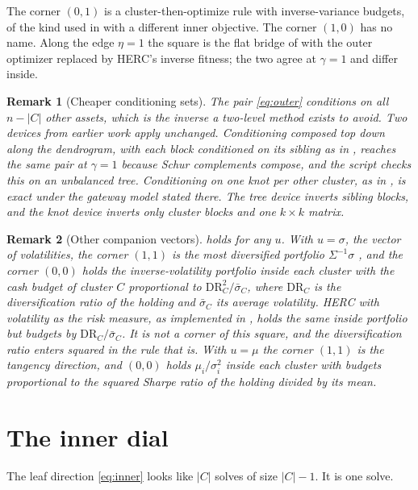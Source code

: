 \documentclass[11pt]{article}
\newtheorem{remark}{Remark}
\begin{document}
The corner $(0,1)$ is a cluster-then-optimize rule with inverse-variance
budgets, of the kind used in \cite{arevalo2019} with a different inner
objective. The
corner $(1,0)$ has no name. Along the edge $\eta=1$ the square is the flat
bridge of \cite{cotton2026nco} with the outer optimizer replaced by
HERC's inverse fitness; the two agree at $\gamma=1$ and differ inside.

\begin{remark}[Cheaper conditioning sets]
The pair \eqref{eq:outer} conditions on all $n-|C|$ other assets, which is
the inverse a two-level method exists to avoid. Two devices from earlier
work apply unchanged. Conditioning composed top down along the dendrogram,
with each block conditioned on its sibling as in \cite{cotton2024schur},
reaches the same pair at $\gamma=1$ because Schur complements compose, and
the script checks this on an unbalanced tree. Conditioning on one knot per
other cluster, as in \cite{cotton2026nco}, is exact under the gateway model
stated there. The tree device inverts sibling blocks, and the knot device
inverts only cluster blocks and one $k\times k$ matrix.
\end{remark}

\begin{remark}[Other companion vectors]
\label{rem:companion}
 holds for any $u$. With $u=\sigma$, the vector of
volatilities, the corner $(1,1)$ is the most diversified portfolio
$\Sigma^{-1}\sigma$ \cite{choueifaty2008}, and the corner $(0,0)$ holds the
inverse-volatility portfolio inside each cluster with the cash budget of
cluster $C$ proportional to $\mathrm{DR}_C^2/\bar\sigma_C$, where
$\mathrm{DR}_C$ is the diversification ratio of the holding and
$\bar\sigma_C$ its average volatility. HERC with volatility as the risk
measure, as implemented in \cite{riskfolio}, holds the same inside
portfolio but budgets by $\mathrm{DR}_C/\bar\sigma_C$. It is not a corner
of this square, and the diversification ratio enters squared in the rule
that is. With $u=\mu$ the corner $(1,1)$ is the tangency direction, and
$(0,0)$ holds $\mu_i/\sigma_i^2$ inside each cluster with budgets
proportional to the squared Sharpe ratio of the holding divided by its
mean.
\end{remark}

\section{The inner dial}
\label{sec:inner}

The leaf direction \eqref{eq:inner} looks like $|C|$ solves of size
$|C|-1$. It is one solve.
\end{document}
